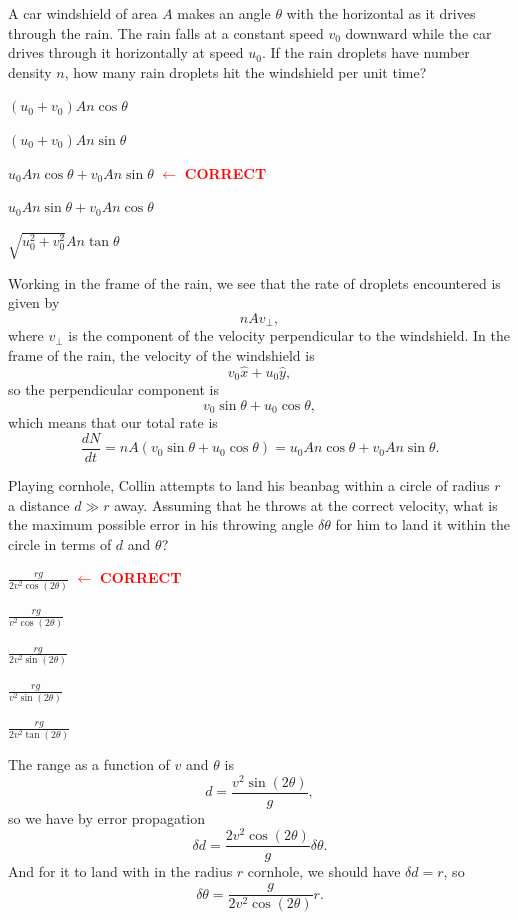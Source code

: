 \documentclass[11pt]{scrartcl}
\newcommand{\cor}{\textcolor{red}{$\leftarrow$ \textbf{CORRECT}}}
\begin{document}
\begin{prob}
    A car windshield of area $A$ makes an angle $\theta$ with the horizontal as it drives through the rain. The rain falls at a constant speed $v_0$ downward while the car drives through it horizontally at speed $u_0$. If the rain droplets have number density $n$, how many rain droplets hit the windshield per unit time?
    \begin{choices}
        \item $(u_0+v_0)An\cos \theta$
        \item $(u_0 + v_0)An \sin \theta$
        \item $u_0An \cos \theta + v_0An\sin\theta$ \cor
        \item $u_0An\sin \theta + v_0An \cos \theta$
        \item $\sqrt{u_0^2 + v_0^2} An\tan\theta$
    \end{choices}
\end{prob}
\begin{sol}
    Working in the frame of the rain, we see that the rate of droplets encountered is given by
    $$nAv_\perp,$$
    where $v_\perp$ is the component of the velocity perpendicular to the windshield. In the frame of the rain, the velocity of the windshield is
    $$v_0 \hat x + u_0 \hat y,$$
    so the perpendicular component is 
    $$v_0\sin \theta + u_0\cos \theta,$$
    which means that our total rate is
    $$\frac{dN}{dt} = nA(v_0\sin \theta + u_0\cos \theta) = u_0An \cos \theta + v_0An\sin\theta.$$
\end{sol}

\begin{prob}
    Playing cornhole, Collin attempts to land his beanbag within a circle of radius $r$ a distance $d \gg r$ away. Assuming that he throws at the correct velocity, what is the maximum possible error in his throwing angle $\delta \theta$ for him to land it within the circle in terms of $d$ and $\theta$?
    \begin{choices}
        \item $\frac{rg}{2v^2\cos (2\theta)}$ \cor
        \item $\frac{rg}{v^2 \cos (2\theta)}$
        \item $\frac{rg}{2v^2\sin (2\theta)}$
        \item $\frac{rg}{v^2\sin(2\theta)}$
        \item $\frac{rg}{2v^2\tan(2\theta)}$
    \end{choices}
\end{prob}
\begin{sol}
    The range as a function of $v$ and $\theta$ is
    $$d = \frac{v^2 \sin (2\theta)}{g},$$
    so we have by error propagation
    $$\delta d = \frac{2v^2 \cos (2\theta)}{g} \delta \theta.$$
    And for it to land with in the radius $r$ cornhole, we should have $\delta d = r$, so
    $$\delta \theta = \frac{g}{2v^2\cos(2\theta)} r.$$
\end{sol}
\end{document}
